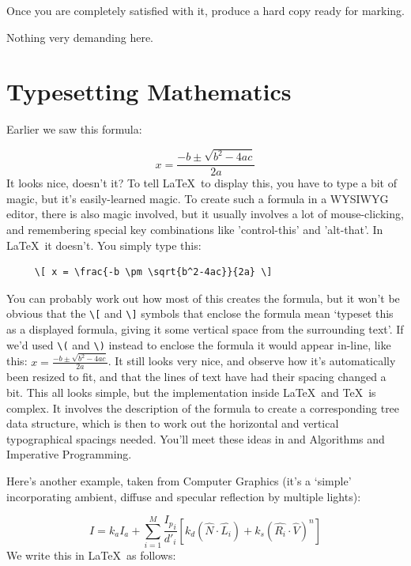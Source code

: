 \begin{refsection}
Once you are completely satisfied with it, produce a hard copy ready for marking.

\begin{demonote}
  Nothing very demanding here.
\end{demonote}

\section{Typesetting Mathematics}
\label{mathssection}

Earlier we saw this formula:

\[ x = \frac{-b \pm \sqrt{b^2-4ac}}{2a} \]
It looks nice, doesn't it? To tell \LaTeX\ to display this, you have to type a bit of magic, but it's easily-learned magic. To create such a formula in a WYSIWYG editor, there is also magic involved, but it usually involves a lot of mouse-clicking, and remembering special key combinations like 'control-this' and 'alt-that'. In \LaTeX\ it doesn't. You simply type this:
\begin{verbatim}
     \[ x = \frac{-b \pm \sqrt{b^2-4ac}}{2a} \]
\end{verbatim}
You can probably work out how most of this creates the formula, but it won't be obvious that the \verb|\[| and  \verb|\]| symbols that enclose the formula mean `typeset this as a displayed formula, giving it some vertical space from the surrounding text'. If we'd used \verb|\(| and \verb|\)| instead to enclose the formula it would appear in-line, like this: \(  x = \frac{-b \pm \sqrt{b^2-4ac}}{2a} \). It still looks very nice, and observe how it's automatically been resized to fit, and that the lines of text have had their spacing changed a bit. This all looks simple, but the implementation inside \LaTeX\ and \TeX\ is complex. It involves  the description of the formula to create a corresponding tree data structure, which is then  to work out the horizontal and vertical typographical spacings needed. You'll meet these ideas in  and  Algorithms and Imperative Programming.

Here's another example, taken from  Computer Graphics (it's a `simple'  incorporating ambient, diffuse and specular reflection by multiple lights):

\[ I = k_a I_a + \sum_{i=1}^M {\frac{{I_p}_i}{d'_i}} [ k_d(\hat{N}\cdot\hat{L_i}) + k_s(\hat{R_i}\cdot\hat{V})^n] \]
%
We write this in \LaTeX\ as follows:


\end{refsection}
